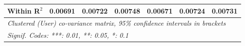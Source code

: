 \begin{table}[htbp]
\begin{threeparttable}[b]
\begin{tabular}{lcccccc}
         Within R$^2$                   & 0.00691         & 0.00722         & 0.00748         & 0.00671          & 0.00724          & 0.00731\\  
         \midrule \midrule
         \multicolumn{7}{l}{\emph{Clustered (User) co-variance matrix, 95\% confidence intervals in brackets}}\\
         \multicolumn{7}{l}{\emph{Signif. Codes: ***: 0.01, **: 0.05, *: 0.1}}\\
      \end{tabular}
   \end{threeparttable}
\end{table}



